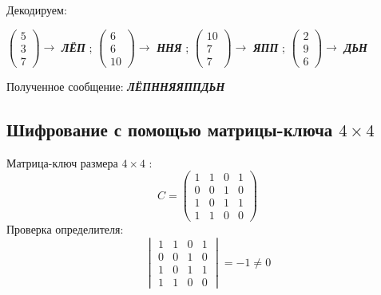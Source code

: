 \documentclass[a5paper, 10pt]{article}
\theoremstyle{definition}
\theoremstyle{plain}
\theoremstyle{remark}
\begin{document}
Декодируем:
\begin{center}
 $ \begin{pmatrix}
5 \\
3\\
7
\end{pmatrix} \to$ \textbf{\textit{ЛЁП}} ;
 $ \begin{pmatrix}
6 \\
6\\
10
\end{pmatrix} \to$ \textbf{\textit{ННЯ}} ;
 $ \begin{pmatrix}
10 \\
7\\
7
\end{pmatrix} \to$ \textbf{\textit{ЯПП}} ;
 $ \begin{pmatrix}
 2 \\
9\\
6
\end{pmatrix} \to$ \textbf{\textit{ДЬН}}  \\

\end{center}
Полученное сообщение:  \textbf{\textit{ЛЁПННЯЯППДЬН}}

\subsection{Шифрование с помощью матрицы-ключа $4 \times 4$}
Матрица-ключ размера  $4 \times 4$ :
\begin{equation}
C =
\begin{pmatrix}
1 & 1 & 0 & 1\\
0 & 0 & 1 & 0 \\
1 & 0 & 1 & 1 \\
1 & 1 & 0 & 0
\end{pmatrix}
\end{equation}
Проверка определителя:
\begin{equation}
\begin{vmatrix}
1 & 1 & 0 & 1\\
0 & 0 & 1 & 0 \\
1 & 0 & 1 & 1 \\
1 & 1 & 0 & 0
\end{vmatrix}
= -1 \neq 0
\end{equation}
\end{document}
